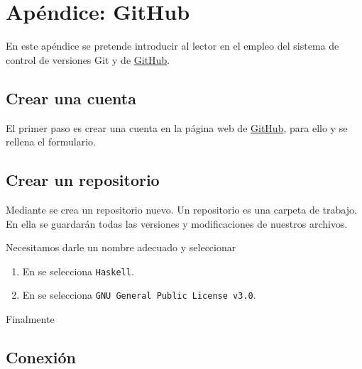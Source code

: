 \chapter{Apéndice: GitHub}

En este apéndice se pretende introducir al lector en el empleo del sistema de
control de versiones Git y de \href{https://github.com/}{GitHub}.

\section{Crear una cuenta}

El primer paso es crear una cuenta en la página web de
\href{https://github.com/}{GitHub}, para ello  y se
rellena el formulario.

\section{Crear un repositorio}

Mediante  se crea un repositorio nuevo.  Un
repositorio es una carpeta de trabajo. En ella se guardarán todas las versiones
y modificaciones de nuestros archivos.

Necesitamos darle un nombre adecuado y seleccionar
\begin{enumerate}
\item En  se selecciona \texttt{Haskell}.
\item En  se selecciona \texttt{GNU General Public License v3.0}.
\end{enumerate}

Finalmente 

\section{Conexión}

